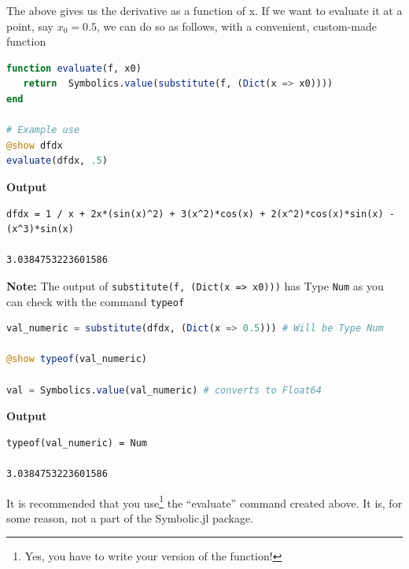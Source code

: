 \vspace*{.2cm}
The above gives us the derivative as a function of x. If we want to evaluate it at a point, say $x_0 = 0.5$, we can do so as follows, with a convenient, custom-made function  
\vspace*{.2cm}
\begin{lstlisting}[language=Julia,style=mystyle]
function evaluate(f, x0)
   return  Symbolics.value(substitute(f, (Dict(x => x0))))
end

# Example use
@show dfdx
evaluate(dfdx, .5)
\end{lstlisting}
\textbf{Output} 
\begin{verbatim}
dfdx = 1 / x + 2x*(sin(x)^2) + 3(x^2)*cos(x) + 2(x^2)*cos(x)*sin(x) - (x^3)*sin(x)

3.0384753223601586
\end{verbatim}
\vspace*{.2cm}
\textbf{Note:} The output of \texttt{substitute(f, (Dict(x => x0)))} has Type \texttt{Num} as you can check with the
command \texttt{typeof}
\begin{lstlisting}[language=Julia,style=mystyle]
val_numeric = substitute(dfdx, (Dict(x => 0.5))) # Will be Type Num

@show typeof(val_numeric)

val = Symbolics.value(val_numeric) # converts to Float64
\end{lstlisting}
\textbf{Output} 
\begin{verbatim}
typeof(val_numeric) = Num

3.0384753223601586
\end{verbatim}
It is recommended that you use\footnote{Yes, you have to write your version of the function!} the ``evaluate'' command created above. It is, for some reason, not a part of the Symbolic.jl package.

